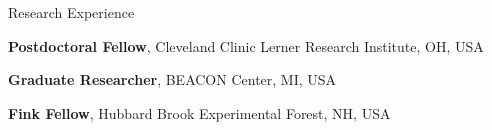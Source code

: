 \begin{rubric}{Research Experience}

\entry*[2019 - 2020] \textbf{Postdoctoral Fellow}, Cleveland Clinic Lerner Research Institute, OH, USA
\ifshort
\else
{}

\fi
%
\entry*[2013 -- 2019] \textbf{Graduate Researcher}, BEACON Center, MI, USA
\ifshort
\else
{}

\fi
%
\entry*[Summer 2013] \textbf{Fink Fellow}, Hubbard Brook Experimental Forest, NH, USA
\ifshort
\else
{}

\fi

%

\end{rubric}